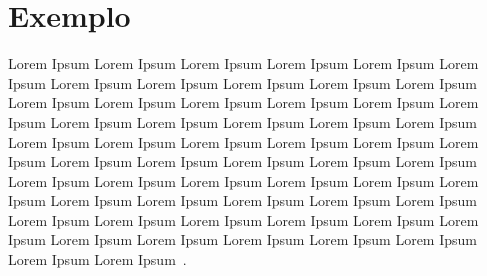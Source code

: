 \section{Exemplo}

Lorem Ipsum Lorem Ipsum Lorem Ipsum Lorem Ipsum Lorem Ipsum Lorem Ipsum Lorem Ipsum Lorem Ipsum Lorem Ipsum Lorem Ipsum Lorem Ipsum Lorem Ipsum Lorem Ipsum Lorem Ipsum Lorem Ipsum Lorem Ipsum Lorem Ipsum Lorem Ipsum Lorem Ipsum Lorem Ipsum Lorem Ipsum Lorem Ipsum Lorem Ipsum Lorem Ipsum Lorem Ipsum Lorem Ipsum Lorem Ipsum Lorem Ipsum Lorem Ipsum Lorem Ipsum Lorem Ipsum Lorem Ipsum Lorem Ipsum Lorem Ipsum Lorem Ipsum Lorem Ipsum Lorem Ipsum Lorem Ipsum Lorem Ipsum Lorem Ipsum Lorem Ipsum Lorem Ipsum Lorem Ipsum Lorem Ipsum Lorem Ipsum Lorem Ipsum Lorem Ipsum Lorem Ipsum Lorem Ipsum Lorem Ipsum Lorem Ipsum Lorem Ipsum Lorem Ipsum Lorem Ipsum Lorem Ipsum Lorem Ipsum Lorem Ipsum~\cite{r2021r}.
